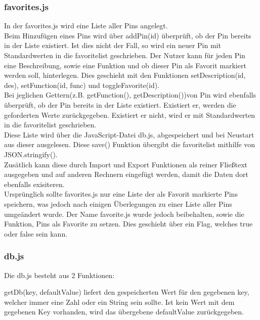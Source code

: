 \subsubsection{favorites.js}

In der \textrm{favorites.js} wird eine Liste aller Pins angelegt. \\
Beim Hinzufügen eines Pins wird über \textrm{addPin(id)} überprüft, ob der Pin bereits in der Liste existiert. Ist dies nicht der 
Fall, so wird ein neuer Pin mit Standardwerten in die \textrm{favoritelist} geschrieben. 
Der Nutzer kann für jeden Pin eine
Beschreibung, sowie eine Funktion und ob dieser Pin als Favorit markiert werden soll, 
hinterlegen. Dies geschieht mit den Funktionen \textrm{setDescription(id, des)}, 
\textrm{setFunction(id, func)} und \textrm{toggleFavorite(id)}.\\
Bei jeglichen Gettern(z.B. \textrm{getFunction()}, \textrm{getDescription()})von Pin wird ebenfalls überprüft, 
ob der Pin bereits in der Liste existiert. Existiert er, werden die 
geforderten Werte zurückgegeben. Existiert er nicht, wird er mit Standardwerten in die \textrm{favoritelist} geschrieben.\\
 Diese Liste wird über die JavaScript-Datei 
\textrm{db.js}, abgespeichert und bei Neustart aus dieser ausgelesen. Diese \textrm{save()} Funktion übergibt die 
\textrm{favoritelist} mithilfe von \textrm{JSON.stringify()}.\\
Zusätlich kann diese durch Import und Export Funktionen als reiner Fließtext ausgegeben und auf anderen Rechnern 
eingefügt werden, damit die Daten dort ebenfalls exisiteren.\\
Ursprünglich sollte \textrm{favorites.js} nur eine Liste der als Favorit markierte Pins speichern, 
was jedoch nach einigen Überlegungen zu einer Liste aller Pins umgeändert wurde. Der Name 
\textrm{favorite.js} wurde jedoch beibehalten, sowie die Funktion, Pins als Favorite zu setzen. 
Dies geschieht über ein Flag, welches \textrm{true} oder \textrm{false} sein kann.\\

\subsubsection{db.js}
Die \textrm{db.js} besteht aus 2 Funktionen: 

\textrm{getDb(key, defaultValue)} liefert den gespeicherten Wert für den
gegebenen \textrm{key}, welcher immer eine Zahl oder ein String sein sollte. Ist
kein Wert mit dem gegebenen Key vorhanden, wird das
übergebene \textrm{defaultValue} zurückgegeben.

